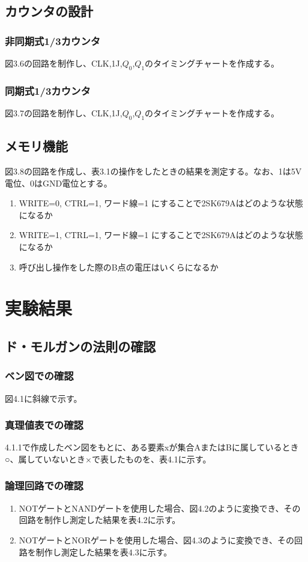 \documentclass{jlreq}
\numberwithin{equation}{section}
\begin{document}
\subsection{カウンタの設計}
\subsubsection{非同期式1/3カウンタ}
図3.6の回路を制作し、CLK,1J,\(Q_0\),\(Q_1\)のタイミングチャートを作成する。

\subsubsection{同期式1/3カウンタ}
図3.7の回路を制作し、CLK,1J,\(Q_0\),\(Q_1\)のタイミングチャートを作成する。

\subsection{メモリ機能}
図3.8の回路を作成し、表3.1の操作をしたときの結果を測定する。なお、1は5V電位、0はGND電位とする。
\begin{enumerate}
  \item WRITE=0, CTRL=1, ワード線=1 にすることで2SK679Aはどのような状態になるか
  \item WRITE=1, CTRL=1, ワード線=1 にすることで2SK679Aはどのような状態になるか
  \item 呼び出し操作をした際のB点の電圧はいくらになるか
\end{enumerate}

\section{実験結果}
\subsection{ド・モルガンの法則の確認}
\subsubsection{ベン図での確認}
図4.1に斜線で示す。

\subsubsection{真理値表での確認}
4.1.1で作成したベン図をもとに、ある要素xが集合AまたはBに属しているとき○、属していないとき×で表したものを、表4.1に示す。

\subsubsection{論理回路での確認}
\begin{enumerate}
  \item NOTゲートとNANDゲートを使用した場合、図4.2のように変換でき、その回路を制作し測定した結果を表4.2に示す。
  \item NOTゲートとNORゲートを使用した場合、図4.3のように変換でき、その回路を制作し測定した結果を表4.3に示す。
\end{enumerate}
\end{document}
